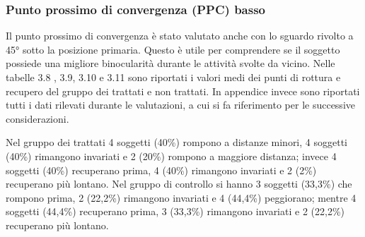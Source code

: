 \subsubsection{Punto prossimo di convergenza (PPC) basso}

Il punto prossimo di convergenza è stato valutato anche con lo sguardo rivolto a 45° sotto la posizione primaria. Questo è utile per comprendere se il soggetto possiede una migliore binocularità durante le attività svolte da vicino. Nelle tabelle 3.8 , 3.9, 3.10 e 3.11 sono riportati i valori medi dei punti di rottura e recupero del gruppo dei trattati e non trattati. In appendice invece sono riportati tutti i dati rilevati durante le valutazioni, a cui si fa riferimento per le successive considerazioni.

Nel gruppo dei trattati  4 soggetti (40\%) rompono a distanze minori, 4 soggetti (40\%) rimangono invariati e 2 (20\%) rompono a maggiore distanza; invece 4 soggetti (40\%) recuperano prima, 4 (40\%) rimangono invariati e 2 (2\%) recuperano più lontano. 
Nel gruppo di controllo si hanno 3 soggetti (33,3\%) che rompono prima, 2 (22,2\%) rimangono invariati e 4 (44,4\%) peggiorano; mentre 4 soggetti (44,4\%) recuperano prima, 3 (33,3\%) rimangono invariati e 2 (22,2\%) recuperano più lontano.
